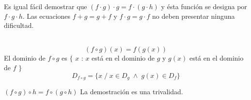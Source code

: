 \begin{teo}
Es igual fácil demostrar que $(f\cdot g)\cdot g=f\cdot (g \cdot h)$ y ésta función se designa por $f \cdot g \cdot h$. Las ecuaciones $f+g=g+f$ \; y \; $f\cdot g=g \cdot f$ no deben presentar ninguna dificultad.\\\\
\end{teo}

\begin{tcolorbox}
\begin{def.}
$$(f \circ g)(x)=f(g(x))$$
El dominio de $f\circ g$ es $\lbrace $ $x$ : $x$ está en el dominio de $g$ \: y \; $g(x)$ está en el dominio de $f$ $\rbrace$
$$D_{f \circ g}= \lbrace x \; / \; x \in D_g \; \land \; g(x)\in D_f \rbrace$$
\end{def.}
\begin{prop}
$(f \circ g) \circ h = f \circ (g \circ h)$   La demostración es una trivalidad.
\end{prop}
\end{tcolorbox}

